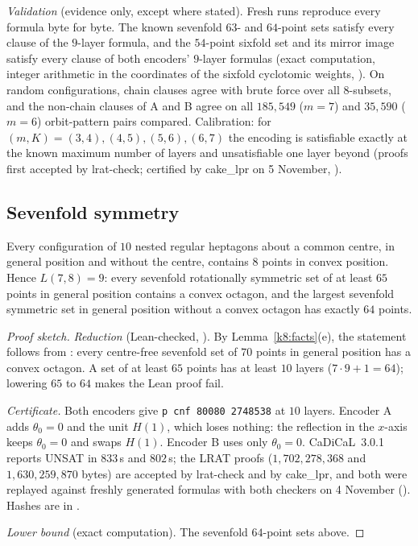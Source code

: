 \emph{Validation} (evidence only, except where stated). Fresh runs reproduce every formula byte for byte. The known
sevenfold $63$- and $64$-point sets satisfy every clause of the $9$-layer formula, and the $54$-point sixfold set and
its mirror image satisfy every clause of both encoders' $9$-layer formulas (exact computation, integer arithmetic in
the coordinates of the sixfold cyclotomic weights, ). On random configurations, chain clauses agree with
brute force over all $8$-subsets, and the non-chain clauses of A and B agree on all $185{,}549$ ($m=7$) and $35{,}590$
($m=6$) orbit-pattern pairs compared. Calibration: for $(m,K)=(3,4),(4,5),(5,6),(6,7)$ the encoding is satisfiable
exactly at the known maximum number of layers and unsatisfiable one layer beyond (proofs first accepted by lrat-check;
certified by cake\_lpr on 5 November, ).

\subsection{Sevenfold symmetry}

\begin{theorem}
\label{k8:c7}
Every configuration of $10$ nested regular heptagons about a common centre, in general position and without the centre,
contains $8$ points in convex position. Hence $L(7,8)=9$: every sevenfold rotationally symmetric set of at least $65$
points in general position contains a convex octagon, and the largest sevenfold symmetric set in general position
without a convex octagon has exactly $64$ points.
\end{theorem}

\begin{proof}[Proof sketch]
\emph{Reduction} (Lean-checked, ). By Lemma~\ref{k8:facts}(e), the statement follows from
: every centre-free sevenfold set of $70$ points in general position has a convex octagon. A set of
at least $65$ points has at least $10$ layers ($7\cdot9+1=64$); lowering $65$ to $64$ makes the Lean proof fail.

\emph{Certificate.} Both encoders give \texttt{p cnf 80080 2748538} at $10$ layers. Encoder A adds $\theta_0=0$ and the
unit $H(1)$, which loses nothing: the reflection in the $x$-axis keeps $\theta_0=0$ and swaps $H(1)$. Encoder B uses
only $\theta_0=0$. CaDiCaL~3.0.1 reports UNSAT in $833$\,s and $802$\,s; the LRAT proofs ($1{,}702{,}278{,}368$ and
$1{,}630{,}259{,}870$ bytes) are accepted by lrat-check and by cake\_lpr, and both were replayed against freshly generated
formulas with both checkers on 4 November (). Hashes are in .

\emph{Lower bound} (exact computation). The sevenfold $64$-point sets above.
\end{proof}

